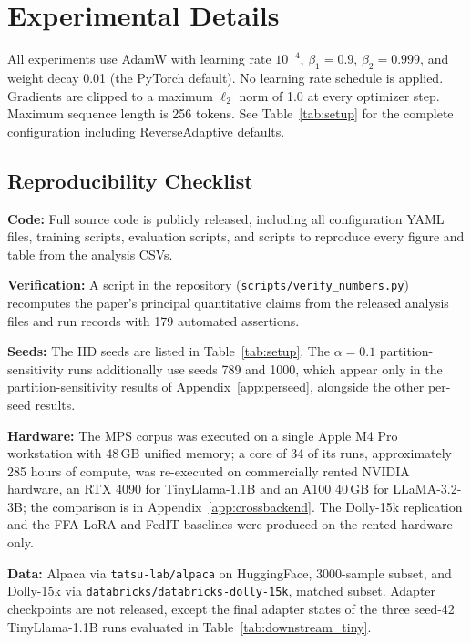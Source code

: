 \section{Experimental Details}
\label{app:hyper}
All experiments use AdamW \cite{loshchilov2019decoupled} with learning rate $10^{-4}$, $\beta_1{=}0.9$, $\beta_2{=}0.999$, and weight decay 0.01 (the PyTorch default). No learning rate schedule is applied. Gradients are clipped to a maximum $\ell_2$ norm of 1.0 at every optimizer step. Maximum sequence length is 256 tokens. See Table~\ref{tab:setup} for the complete configuration including ReverseAdaptive defaults.

\subsection{Reproducibility Checklist}
\label{app:repro}
\textbf{Code:} Full source code is publicly released, including all configuration YAML files, training scripts, evaluation scripts, and scripts to reproduce every figure and table from the analysis CSVs.

\textbf{Verification:} A script in the repository (\texttt{scripts/verify\_numbers.py}) recomputes the paper's principal quantitative claims from the released analysis files and run records with 179 automated assertions.

\textbf{Seeds:} The IID seeds are listed in Table~\ref{tab:setup}. The $\alpha{=}0.1$ partition-sensitivity runs additionally use seeds 789 and 1000, which appear only in the partition-sensitivity results of Appendix~\ref{app:perseed}, alongside the other per-seed results.

\textbf{Hardware:} The MPS corpus was executed on a single Apple M4 Pro workstation with 48\,GB unified memory; a core of 34 of its runs, approximately 285 hours of compute, was re-executed on commercially rented NVIDIA hardware, an RTX 4090 for TinyLlama-1.1B and an A100 40\,GB for LLaMA-3.2-3B; the comparison is in Appendix~\ref{app:crossbackend}. The Dolly-15k replication and the FFA-LoRA and FedIT baselines were produced on the rented hardware only.

\textbf{Data:} Alpaca \cite{taori2023alpaca} via \texttt{tatsu-lab/alpaca} on HuggingFace, 3000-sample subset, and Dolly-15k \cite{dolly2023} via \texttt{databricks/databricks-dolly-15k}, matched subset. Adapter checkpoints are not released, except the final adapter states of the three seed-42 TinyLlama-1.1B runs evaluated in Table~\ref{tab:downstream_tiny}.

